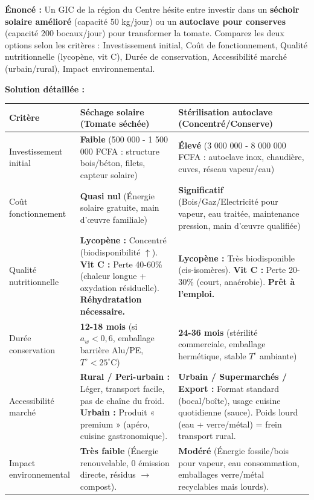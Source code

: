 \documentclass[11pt]{article}
\begin{document}
\begin{exoresolu}
\textbf{Énoncé :} Un GIC de la région du Centre hésite entre investir dans un \textbf{séchoir solaire amélioré} (capacité 50 kg/jour) ou un \textbf{autoclave pour conserves} (capacité 200 bocaux/jour) pour transformer la tomate. Comparez les deux options selon les critères : Investissement initial, Coût de fonctionnement, Qualité nutritionnelle (lycopène, vit C), Durée de conservation, Accessibilité marché (urbain/rural), Impact environnemental.

\textbf{Solution détaillée :}

\begin{center}
\begin{tabularx}{\linewidth}{|l|X|X|}
\hline
\textbf{Critère} & \textbf{Séchage solaire (Tomate séchée)} & \textbf{Stérilisation autoclave (Concentré/Conserve)} \\
\hline
Investissement initial & \textbf{Faible} (500 000 - 1 500 000 FCFA : structure bois/béton, filets, capteur solaire) & \textbf{Élevé} (3 000 000 - 8 000 000 FCFA : autoclave inox, chaudière, cuves, réseau vapeur/eau) \\
\hline
Coût fonctionnement & \textbf{Quasi nul} (Énergie solaire gratuite, main d'œuvre familiale) & \textbf{Significatif} (Bois/Gaz/Electricité pour vapeur, eau traitée, maintenance pression, main d'œuvre qualifiée) \\
\hline
Qualité nutritionnelle & \textbf{Lycopène :} Concentré (biodisponibilité $\uparrow$). \textbf{Vit C :} Perte 40-60\% (chaleur longue + oxydation résiduelle). \textbf{Réhydratation nécessaire.} & \textbf{Lycopène :} Très biodisponible (cis-isomères). \textbf{Vit C :} Perte 20-30\% (court, anaérobie). \textbf{Prêt à l'emploi.} \\
\hline
Durée conservation & \textbf{12-18 mois} (si $a_w < 0,6$, emballage barrière Alu/PE, $T^\circ < 25^\circ$C) & \textbf{24-36 mois} (stérilité commerciale, emballage hermétique, stable $T^\circ$ ambiante) \\
\hline
Accessibilité marché & \textbf{Rural / Peri-urbain :} Léger, transport facile, pas de chaîne du froid. \textbf{Urbain :} Produit « premium » (apéro, cuisine gastronomique). & \textbf{Urbain / Supermarchés / Export :} Format standard (bocal/boîte), usage cuisine quotidienne (sauce). Poids lourd (eau + verre/métal) = frein transport rural. \\
\hline
Impact environnemental & \textbf{Très faible} (Énergie renouvelable, 0 émission directe, résidus $\rightarrow$ compost). & \textbf{Modéré} (Énergie fossile/bois pour vapeur, eau consommation, emballages verre/métal recyclables mais lourds). \\
\hline
\end{tabularx}
\end{center}


\end{exoresolu}
\end{document}
